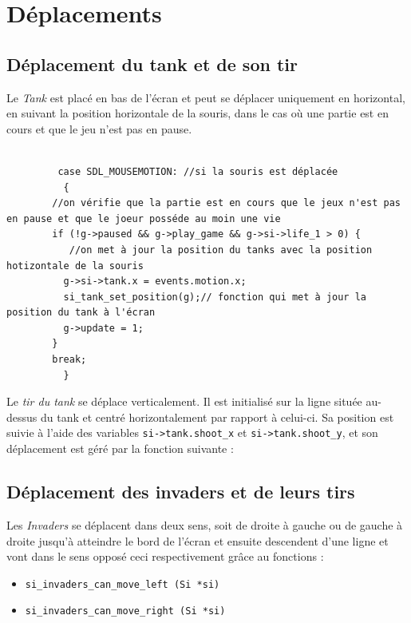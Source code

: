 \documentclass[12pt,a4paper]{report}
\begin{document}
\section{Déplacements}

\subsection{Déplacement du tank et de son tir }
 Le \textit{Tank} est placé en bas de l'écran et peut se déplacer uniquement en horizontal, en suivant la position horizontale de la souris, dans le cas où une partie est en cours et que le jeu n'est pas en pause.

\begin{lstlisting}
   
		 case SDL_MOUSEMOTION: //si la souris est déplacée
	      {
		//on vérifie que la partie est en cours que le jeux n'est pas en pause et que le joeur posséde au moin une vie
		if (!g->paused && g->play_game && g->si->life_1 > 0) {
		   //on met à jour la position du tanks avec la position hotizontale de la souris
		  g->si->tank.x = events.motion.x;
		  si_tank_set_position(g);// fonction qui met à jour la position du tank à l'écran
		  g->update = 1;
		}
		break;
	      }	
\end{lstlisting}

 \vspace{1cm} 
Le \textit{tir du tank} se déplace verticalement. Il est initialisé sur la ligne située au-dessus du tank et centré horizontalement par rapport à celui-ci.  
Sa position est suivie à l’aide des variables \texttt{si->tank.shoot\_x} et \texttt{si->tank.shoot\_y}, et son déplacement est géré par la fonction suivante :

   

\subsection{Déplacement des invaders et de leurs tirs}
 Les \textit{Invaders} se déplacent dans deux sens, soit de droite à gauche ou de gauche à droite jusqu'à atteindre le bord de l'écran et ensuite descendent d'une ligne et vont dans le sens opposé ceci respectivement grâce au fonctions :
 \begin{itemize}
     \item \texttt{si\_invaders\_can\_move\_left (Si *si)}
     \item \texttt{si\_invaders\_can\_move\_right (Si *si)}
 \end{itemize}    
\end{document}
